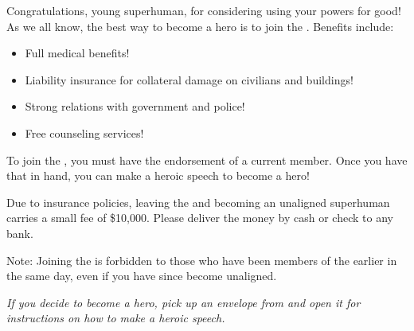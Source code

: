 \documentclass[white]{guildcamp1}
\begin{document}
\name{\wHeroRecruitment{}}

Congratulations, young superhuman, for considering using your powers for good!  As we all know, the best way to become a hero is to join the \cHeroLeague{\intro}.  Benefits include:

\begin{itemize}
\item Full medical benefits!
\item Liability insurance for collateral damage on civilians and buildings!
\item Strong relations with government and police!
\item Free counseling services!
\end{itemize}

To join the \cHeroLeague{}, you must have the endorsement of a current \cHeroLeague{} member.  Once you have that in hand, you can make a heroic speech to become a hero!

Due to insurance policies, leaving the \cHeroLeague{} and becoming an unaligned superhuman carries a small fee of \$10,000.  Please deliver the money by cash or check to any bank.

Note: Joining the \cHeroLeague{} is forbidden to those who have been members of the \cVillainCompact{\intro} earlier in the same day, even if you have since become unaligned.

\textit{If you decide to become a hero, pick up an envelope from \sBecomeHero{} and open it for instructions on how to make a heroic speech.}
\end{document}
